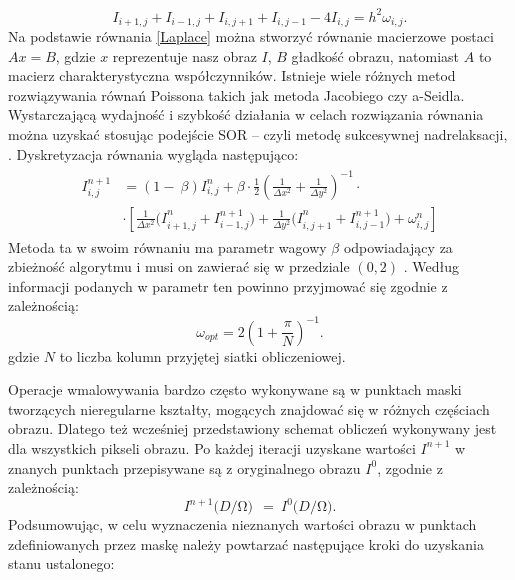 \documentclass[12pt, twoside, openany]{report}
\theoremstyle{definition}
\begin{document}
\begin{equation}
I_{i+1,j}+I_{i-1,j}+I_{i,j+1}+I_{i,j-1}-4I_{i,j}=h^2{\omega }_{i,j}
\label{Laplace}
.
\end{equation}
Na podstawie równania \eqref{Laplace} można stworzyć równanie macierzowe postaci $Ax=B$, gdzie $x$ reprezentuje nasz obraz $I$, $B$ gładkość obrazu, natomiast $A$ to macierz charakterystyczna współczynników. Istnieje wiele różnych metod rozwiązywania równań Poissona takich jak metoda Jacobiego czy 
a-Seidla.  Wystarczającą wydajność i szybkość działania w celach rozwiązania równania można uzyskać stosując podejście SOR – czyli metodę sukcesywnej nadrelaksacji, \cite{blacksuccessive}. Dyskretyzacja równania wygląda następująco:
\begin{align}
\begin{aligned}
I^{n+1}_{i,j}
&= \left(1-\ \beta \right)I^n_{i,j}+\beta \cdot \frac{1}{2}{\left(\frac{1}{\Delta x^2}+\frac{1}{\Delta y^2}\right)}^{-1} \cdot \\[1ex]
&\cdot \left[\frac{1}{\Delta x^2}{(I}^n_{i+1,j}+I^{n+1}_{i-1,j})+\frac{1}{\Delta y^2}{(I}^n_{i,j+1}+I^{n+1}_{i,j-1})+{\omega }^n_{i,j}\right]
\end{aligned}
\label{DiscreteSOR}
\end{align}
Metoda ta w swoim równaniu ma parametr wagowy $\beta$ odpowiadający za zbieżność algorytmu i musi on zawierać się w przedziale $(0,2)$ \cite{neumann1981kahan}. Według informacji podanych w  \cite{blacksuccessive} parametr ten powinno przyjmować się zgodnie z zależnością:
\begin{equation}
{\omega }_{opt}=2{\left(1+\frac{\pi }{N}\right)}^{-1}
\label{BetaChoose}
.
\end{equation}
gdzie $N$ to liczba kolumn przyjętej siatki obliczeniowej. 
\par
Operacje wmalowywania bardzo często wykonywane są w punktach maski tworzących nieregularne kształty, mogących znajdować się w różnych częściach obrazu. Dlatego też wcześniej przedstawiony schemat obliczeń wykonywany jest dla wszystkich pikseli obrazu. Po każdej iteracji uzyskane wartości $I^{n+1}$ w znanych punktach przepisywane są z oryginalnego obrazu $I^{0}$, zgodnie z zależnością:
\begin{equation}
I^{n+1}(D/\mathrm{\Omega }\mathrm{)\ }\ ={\ I}^0(D/\mathrm{\Omega }\mathrm{)}.
\label{retrieveMask}
\end{equation}
Podsumowując, w celu wyznaczenia nieznanych wartości obrazu w punktach zdefiniowanych przez maskę należy powtarzać następujące kroki do uzyskania stanu ustalonego:
\end{document}
